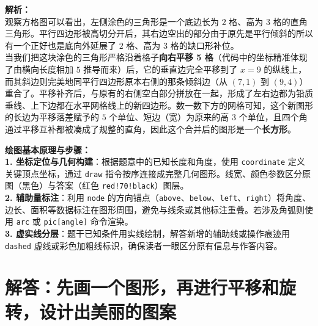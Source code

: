\vspace{0.6cm}
{\small\color{gray}
\textbf{解析：}\\
观察方格图可以看出，左侧涂色的三角形是一个底边长为 $2$ 格、高为 $3$ 格的直角三角形。平行四边形被高切分开后，其右边空出的部分由于原先是平行倾斜的所以有一个正好也是底向外延展了 $2$ 格、高为 $3$ 格的缺口形补位。\\
当我们把这块涂色的三角形严格沿着格子\textbf{向右平移 5 格}（代码中的坐标精准体现了由横向长度相加 $5$ 推导而来）后，它的垂直边完全平移到了 $x=9$ 的纵线上，而其斜边则完美地同平行四边形原本右侧的那条倾斜边（从 $(7,1)$ 到 $(9,4)$）重合了。平移补齐后，与原有的右侧空白部分拼放在一起，形成了左右边都为铅质垂线、上下边都在水平网格线上的新四边形。数一数下方的网格可知，这个新图形的长边为平移落差赋予的 $5$ 个单位、短边（宽）为原来的高 $3$ 个单位，且四个角通过平移互补都被凑成了规整的直角，因此这个合并后的图形是一个\textbf{长方形}。
}


\vspace{0.6cm}

{\small\color{blue!70!black}
\textbf{绘图基本原理与步骤：}\\
\textbf{1. 坐标定位与几何构建}：根据题意中的已知长度和角度，使用 \texttt{coordinate} 定义关键顶点坐标，通过 \texttt{draw} 指令按序连接成完整几何图形。线宽、颜色参数区分原图（黑色）与答案（红色 \texttt{red!70!black}）图层。\\
\textbf{2. 辅助量标注}：利用 \texttt{node} 的方向锚点（\texttt{above}、\texttt{below}、\texttt{left}、\texttt{right}）将角度、边长、面积等数据标注在图形周围，避免与线条或其他标注重叠。若涉及角弧则使用 \texttt{arc} 或 \texttt{pic[angle]} 命令渲染。\\
\textbf{3. 虚实线分层}：题干已知条件用实线绘制，解答新增的辅助线或操作痕迹用 \texttt{dashed} 虚线或彩色加粗线标识，确保读者一眼区分原有信息与作答内容。
}

\newpage


\newpage

\section{解答：先画一个图形，再进行平移和旋转，设计出美丽的图案}

\vspace{0.6cm}

